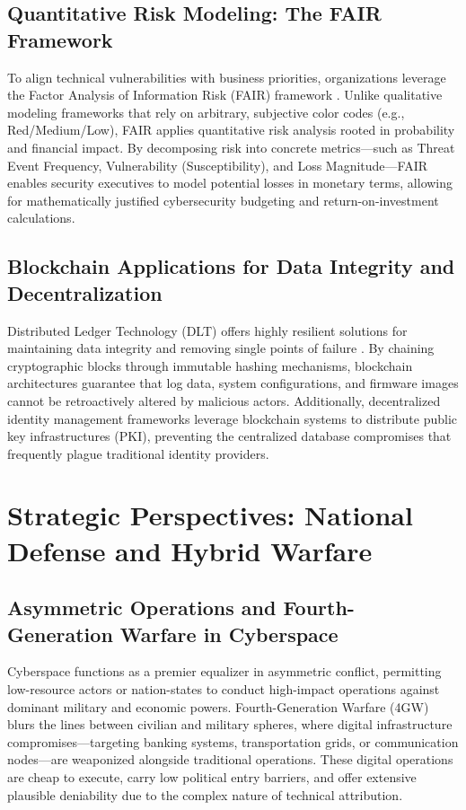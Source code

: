 \documentclass[11pt,a4paper]{article}
\begin{document}
\subsection{Quantitative Risk Modeling: The FAIR Framework}
To align technical vulnerabilities with business priorities, organizations leverage the Factor Analysis of Information Risk (FAIR) framework \cite{b9}. Unlike qualitative modeling frameworks that rely on arbitrary, subjective color codes (e.g., Red/Medium/Low), FAIR applies quantitative risk analysis rooted in probability and financial impact. By decomposing risk into concrete metrics—such as Threat Event Frequency, Vulnerability (Susceptibility), and Loss Magnitude—FAIR enables security executives to model potential losses in monetary terms, allowing for mathematically justified cybersecurity budgeting and return-on-investment calculations.

\subsection{Blockchain Applications for Data Integrity and Decentralization}
Distributed Ledger Technology (DLT) offers highly resilient solutions for maintaining data integrity and removing single points of failure \cite{b2}. By chaining cryptographic blocks through immutable hashing mechanisms, blockchain architectures guarantee that log data, system configurations, and firmware images cannot be retroactively altered by malicious actors. Additionally, decentralized identity management frameworks leverage blockchain systems to distribute public key infrastructures (PKI), preventing the centralized database compromises that frequently plague traditional identity providers.


\section{Strategic Perspectives: National Defense and Hybrid Warfare}

\subsection{Asymmetric Operations and Fourth-Generation Warfare in Cyberspace}
Cyberspace functions as a premier equalizer in asymmetric conflict, permitting low-resource actors or nation-states to conduct high-impact operations against dominant military and economic powers. Fourth-Generation Warfare (4GW) blurs the lines between civilian and military spheres, where digital infrastructure compromises—targeting banking systems, transportation grids, or communication nodes—are weaponized alongside traditional operations. These digital operations are cheap to execute, carry low political entry barriers, and offer extensive plausible deniability due to the complex nature of technical attribution.
\end{document}
